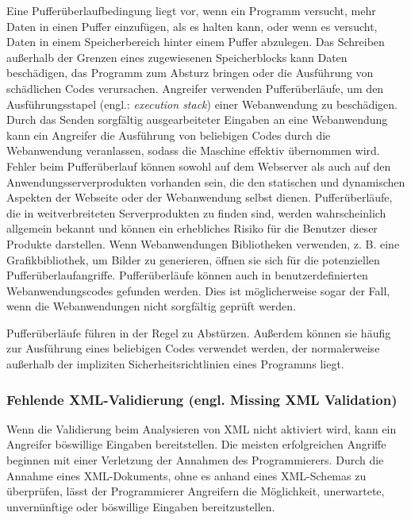 Eine Pufferüberlaufbedingung liegt vor, wenn ein Programm versucht, mehr Daten in einen Puffer einzufügen, als es halten kann, oder wenn es versucht, Daten in einem Speicherbereich hinter einem Puffer abzulegen. Das Schreiben außerhalb der Grenzen eines zugewiesenen Speicherblocks kann Daten beschädigen, das Programm zum Absturz bringen oder die Ausführung von schädlichen Codes verursachen.
Angreifer verwenden Pufferüberläufe, um den Ausführungsstapel (engl.: \textit{execution stack}) einer Webanwendung zu beschädigen. Durch das Senden sorgfältig ausgearbeiteter Eingaben an eine Webanwendung kann ein Angreifer die Ausführung von beliebigen Codes durch die Webanwendung veranlassen, sodass die Maschine effektiv übernommen wird. Fehler beim Pufferüberlauf können sowohl auf dem Webserver als auch auf den Anwendungsserverprodukten vorhanden sein, die den statischen und dynamischen Aspekten der Webseite oder der Webanwendung selbst dienen. Pufferüberläufe, die in weitverbreiteten Serverprodukten zu finden sind, werden wahrscheinlich allgemein bekannt und können ein erhebliches Risiko für die Benutzer dieser Produkte darstellen. Wenn Webanwendungen Bibliotheken verwenden, z. B. eine Grafikbibliothek, um Bilder zu generieren, öffnen sie sich für die potenziellen Pufferüberlaufangriffe. Pufferüberläufe können auch in benutzerdefinierten Webanwendungscodes gefunden werden. Dies ist möglicherweise sogar der Fall, wenn die Webanwendungen nicht sorgfältig geprüft werden.

Pufferüberläufe führen in der Regel zu Abstürzen. Außerdem können sie häufig zur Ausführung eines beliebigen Codes verwendet werden, der normalerweise außerhalb der impliziten Sicherheitsrichtlinien eines Programms liegt\cite{bufferoverflow16}.\\

\subsubsection{Fehlende XML-Validierung (engl. Missing XML Validation)}

Wenn die Validierung beim Analysieren von XML nicht aktiviert wird, kann ein Angreifer böswillige Eingaben bereitstellen. Die meisten erfolgreichen Angriffe beginnen mit einer Verletzung der Annahmen des Programmierers. Durch die Annahme eines XML-Dokuments, ohne es anhand eines XML-Schemas zu überprüfen, lässt der Programmierer Angreifern die Möglichkeit, unerwartete, unvernünftige oder böswillige Eingaben bereitzustellen\cite{bufferoverflow16}.\\ 

